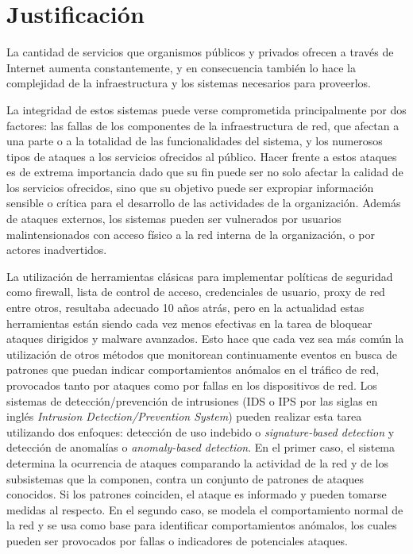 \section*{Justificación}
La cantidad de servicios que organismos públicos y privados ofrecen a través de Internet aumenta constantemente, y en consecuencia también lo hace la complejidad de la infraestructura y los sistemas necesarios para proveerlos. \par
La integridad de estos sistemas puede verse comprometida principalmente por dos factores: las fallas de los componentes de la infraestructura de red\cite{Gill:2011:UNF:2043164.2018477}, que afectan a una parte o a la totalidad de las funcionalidades del sistema, y los numerosos tipos de ataques\cite{Karumanchi:2014:WLS:2554850.2555010}\cite{mutchler15:mobilewebapps} a los servicios ofrecidos al público. Hacer frente a estos ataques es de extrema importancia dado que su fin puede ser no solo afectar la calidad de los servicios ofrecidos, sino que su objetivo puede ser expropiar información sensible o crítica para el desarrollo de las actividades de la organización. Además de ataques externos, los sistemas pueden ser vulnerados por usuarios malintensionados con acceso físico a la red interna de la organización, o por actores inadvertidos\cite{Kraemer2007143}\cite{Kraemer2009509}\cite{Liginlal2009215}\cite{Ahmed12humanerrors}. \par
La utilización de herramientas clásicas para implementar políticas de seguridad como firewall, lista de control de acceso, credenciales de usuario, proxy de red entre otros, resultaba adecuado 10 años atrás, pero en la actualidad estas herramientas están siendo cada vez menos efectivas en la tarea de bloquear ataques dirigidos y malware avanzados. Esto hace que cada vez sea más común la utilización de otros métodos que monitorean continuamente eventos en busca de patrones que puedan indicar comportamientos anómalos en el tráfico de red, provocados tanto por ataques como por fallas en los dispositivos de red. Los sistemas de detección/prevención de intrusiones (IDS o IPS por las siglas en inglés \textit{Intrusion Detection/Prevention System}) pueden realizar esta tarea utilizando dos enfoques: detección de uso indebido o \textit{signature-based detection} y detección de anomalías o \textit{anomaly-based detection}\cite{Milenkoski:2015:ECI:2808687.2808691}. En el primer caso, el sistema determina la ocurrencia de ataques comparando la actividad de la red y de los subsistemas que la componen, contra un conjunto de patrones de ataques conocidos. Si los patrones coinciden, el ataque es informado y pueden tomarse medidas al respecto. En el segundo caso, se modela el comportamiento normal de la red y se usa como base para identificar comportamientos anómalos, los cuales pueden ser provocados por fallas o indicadores de potenciales ataques. \par
